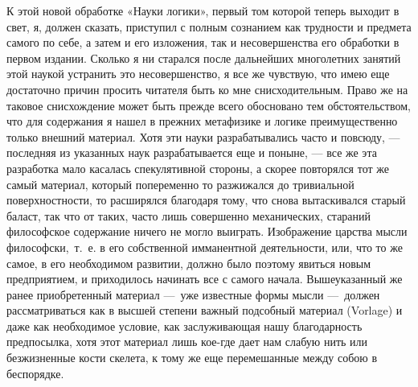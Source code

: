 К этой новой обработке «Науки логики», первый
том которой теперь выходит в свет, я, должен сказать, приступил с полным
сознанием как трудности и предмета самого по себе, а затем и его изложения,
так и несовершенства его обработки в первом издании. Сколько я ни старался
после дальнейших многолетних занятий этой наукой устранить это
несовершенство, я все же чувствую, что имею еще достаточно причин просить
читателя быть ко мне снисходительным. Право же на таковое снисхождение
может быть прежде всего обосновано тем обстоятельством, что для содержания
я нашел в прежних метафизике и логике преимущественно только внешний
материал. Хотя эти науки разрабатывались часто и повсюду, — последняя из
указанных наук разрабатывается еще и поныне, — все же эта разработка мало
касалась спекулятивной стороны, а скорее повторялся тот же самый материал,
который попеременно то разжижался до тривиальной поверхностности, то
расширялся благодаря тому, что снова вытаскивался старый баласт, так что от
таких, часто лишь совершенно механических, стараний философское содержание
ничего не могло выиграть. Изображение царства мысли философски,~т.~е. в его
собственной имманентной деятельности, или, что то же самое, в его
необходимом развитии, должно было поэтому явиться новым предприятием, и
приходилось начинать все с самого начала. Вышеуказанный же ранее
приобретенный материал —~уже известные формы мысли —~должен рассматриваться
как в высшей степени важный подсобный материал (Vorlage) и даже как
необходимое условие, как заслуживающая нашу благодарность предпосылка, хотя
этот материал лишь кое-где дает нам слабую нить или безжизненные кости
скелета, к тому же еще перемешанные между собою в беспорядке.

